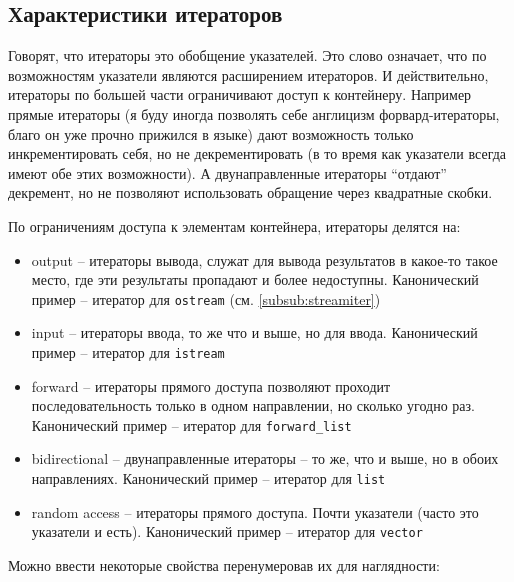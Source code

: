 \documentclass[a4paper,12pt,oneside]{book}
\newif\ifanswers
\begin{document}
\ifanswers
Тут нет единого рецепта: если важно гарантировать константную сложность или ошибку компиляции тогда разностью. А если важно, чтобы всегда работало, тогда вспомогательной функцией.
\fi

\subsection{Характеристики итераторов}\label{subsub:itertraits}

Говорят, что итераторы это обобщение указателей. Это слово означает, что по возможностям указатели являются расширением итераторов. И действительно, итераторы по большей части ограничивают доступ к контейнеру. Например прямые итераторы (я буду иногда позволять себе англицизм форвард-итераторы, благо он уже прочно прижился в языке) дают возможность только инкрементировать себя, но не декрементировать (в то время как указатели всегда имеют обе этих возможности). А двунаправленные итераторы ``отдают'' декремент, но не позволяют использовать обращение через квадратные скобки.

По ограничениям доступа к элементам контейнера, итераторы делятся на:

\begin {itemize}
\item output -- итераторы вывода, служат для вывода результатов в какое-то такое место, где эти результаты пропадают и более недоступны. Канонический пример -- итератор для \lstinline!ostream! (см. \ref{subsub:streamiter})
\item input -- итераторы ввода, то же что и выше, но для ввода. Канонический пример -- итератор для \lstinline!istream!
\item forward -- итераторы прямого доступа позволяют проходит последовательность только в одном направлении, но сколько угодно раз. Канонический пример -- итератор для \lstinline!forward_list!
\item bidirectional -- двунаправленные итераторы -- то же, что и выше, но в обоих направлениях. Канонический пример -- итератор для \lstinline!list!
\item random access -- итераторы прямого доступа. Почти указатели (часто это указатели и есть). Канонический пример -- итератор для \lstinline!vector!
\end {itemize}

Можно ввести некоторые свойства перенумеровав их для наглядности:
\end{document}

